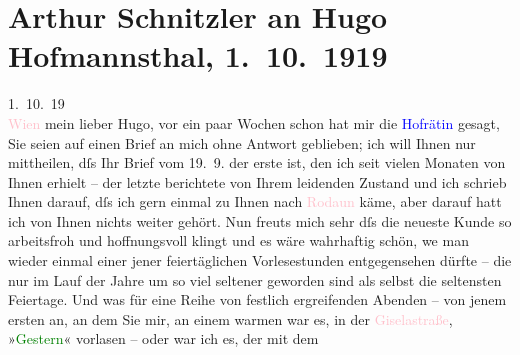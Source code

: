 

               \section[Arthur Schnitzler an Hugo Hofmannsthal, 1. 10. 1919]{ Arthur Schnitzler an Hugo Hofmannsthal, 1. 10. 1919}\nopagebreak{}\rehead{ }\normalsize\beginnumbering{} \toendnotes[C]{\smallbreak\pagebreak[2]} 
\toendnotes[C]{\smallbreak}\pstart
           \raggedleft{}{\pb}1. 10. 19{\\}\textcolor{pink}{Wien}{}\ledrightnote{\textcolor{pink}{Wien}}\pend
           \pstart
           mein lieber Hugo, vor ein paar Wochen schon hat mir die \textcolor{blue}{Hofrätin}{}\ledrightnote{\textcolor{blue}{Berta Zuckerkandl}} gesagt, Sie seien auf einen Brief an mich
               ohne Antwort geblieben; ich will Ihnen nur mittheilen, dſs Ihr Brief vom
                  19. 9. der erste ist, den ich seit vielen Monaten von Ihnen erhielt –
               der letzte berichtete von Ihrem leidenden Zustand und ich schrieb Ihnen darauf, dſs
               ich gern einmal zu Ihnen nach \textcolor{pink}{Rodaun}{}\ledrightnote{\textcolor{pink}{Rodaun}} käme, aber
               darauf hatt ich von Ihnen nichts weiter gehört. Nun freuts mich sehr dſs die neueste
               Kunde so arbeitsfroh und hoffnungsvoll klingt und es wäre wahrhaftig schön, we{\geminationn} man wieder einmal einer jener feiertäglichen
               Vorlesestunden entgegensehen dürfte – die nur im Lauf der Jahre um so viel seltener
               geworden sind als selbst die seltensten Feiertage. Und was für eine Reihe von
               festlich ergreifenden Abenden – von jenem ersten an, an dem Sie mir, an einem warmen
                  \label{K_L02327_1v}\label{K_L02327_1h} war es, in der \textcolor{pink}{Giselastraße}{}\ledrightnote{\textcolor{pink}{Bösendorferstraße}}, »\textcolor{green}{Gestern}{}\ledrightnote{\textcolor{green}{Gestern. Dramatische Studie in einem Akt in Versen}}« vorlasen – oder war ich es, der mit dem
